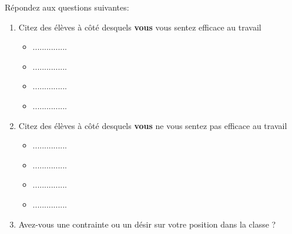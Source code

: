 \begin{que}
    Répondez aux questions suivantes:
        \begin{enumerate}
            \item Citez des élèves à côté desquels \textbf{vous} vous sentez efficace au travail
            \begin{multicols}{2}
                \begin{itemize}
                    \item ...............
                    \item ...............
                    \item ...............
                    \item ...............
                \end{itemize}
            \end{multicols}
            \item Citez des élèves à côté desquels \textbf{vous} ne vous sentez pas efficace au travail
            \begin{multicols}{2}
                \begin{itemize}
                    \item ...............
                    \item ...............
                    \item ...............
                    \item ...............
                \end{itemize}
            \end{multicols}
            \item Avez-vous une contrainte ou un désir sur votre position dans la classe ?
        \end{enumerate}
    \end{que}
    
        \medskip

